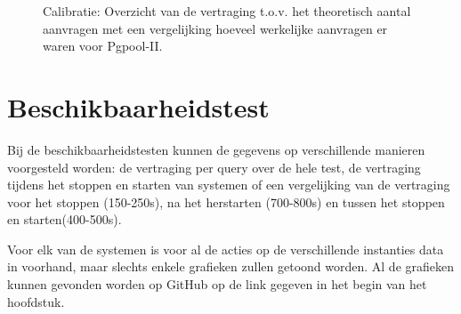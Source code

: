 \begin{figure}[h!] 
	\centering
	\caption{Calibratie: Overzicht van de vertraging t.o.v. het theoretisch aantal aanvragen met een vergelijking hoeveel werkelijke aanvragen er waren voor Pgpool-II. }
	\label{fig:calibratie-queriesperseconde-pgpool-ii}
\end{figure}

\section{Beschikbaarheidstest}
Bij de beschikbaarheidstesten kunnen de gegevens op verschillende manieren voorgesteld worden: de vertraging per query over de hele test, de vertraging tijdens het stoppen en starten van systemen of een vergelijking van de vertraging voor het stoppen (150-250s), na het herstarten (700-800s) en tussen het stoppen en starten(400-500s). 

Voor elk van de systemen is voor al de acties op de verschillende instanties data in voorhand, maar slechts enkele grafieken zullen getoond worden. Al de grafieken kunnen gevonden worden op GitHub op de link gegeven in het begin van het hoofdstuk. 

